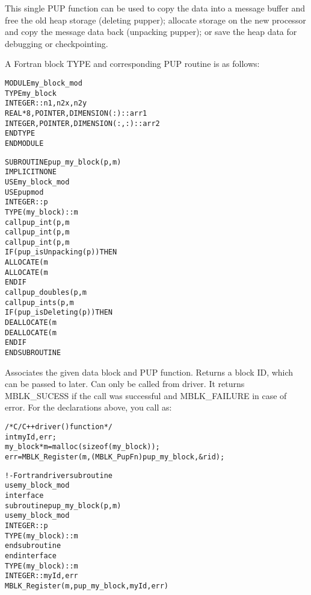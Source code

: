 \documentclass[10pt]{article}
\begin{document}
This single PUP function can be used to copy the  data into a
message buffer and free the old heap storage (deleting pupper); allocate
storage on the new processor and copy the message data back (unpacking pupper);
or save the heap data for debugging or checkpointing.

A Fortran block TYPE and corresponding PUP routine is as follows:

\begin{alltt}
     MODULE my_block_mod
       TYPE my_block
         INTEGER :: n1,n2x,n2y
         REAL*8, POINTER, DIMENSION(:) :: arr1
         INTEGER, POINTER, DIMENSION(:,:) :: arr2
       END TYPE
     END MODULE
 
     SUBROUTINE pup_my_block(p,m)
       IMPLICIT NONE
       USE my_block_mod
       USE pupmod
       INTEGER :: p
       TYPE(my_block) :: m
       call pup_int(p,m%n1)
       call pup_int(p,m%n2x)
       call pup_int(p,m%n2y)
       IF (pup_isUnpacking(p)) THEN
         ALLOCATE(m%arr1(m%n1))
         ALLOCATE(m%arr2(m%n2x,m%n2y))
       END IF
       call pup_doubles(p,m%arr1,m%n1)
       call pup_ints(p,m%arr2,m%n2x*m%n2y)
       IF (pup_isDeleting(p)) THEN
         DEALLOCATE(m%arr1)
         DEALLOCATE(m%arr2)
       END IF
     END SUBROUTINE
\end{alltt}


     Associates the given data block and PUP function.  Returns a block
     ID, which can be passed to  later.  Can only be
     called from driver.  It returns MBLK\_SUCESS if the call was successful
     and MBLK\_FAILURE in case of error. For the declarations above, you call
      as:

\begin{alltt}
          /*C/C++ driver() function*/
	  int myId, err;
          my_block *m=malloc(sizeof(my_block));
          err =MBLK_Register(m,(MBLK_PupFn)pup_my_block,&rid);
 
          !- Fortran driver subroutine
          use my_block_mod
          interface
            subroutine pup_my_block(p,m)
              use my_block_mod
              INTEGER :: p
              TYPE(my_block) :: m
            end subroutine
          end interface
          TYPE(my_block) :: m
          INTEGER :: myId,err
          MBLK_Register(m,pup_my_block,myId,err)
\end{alltt}
\end{document}
